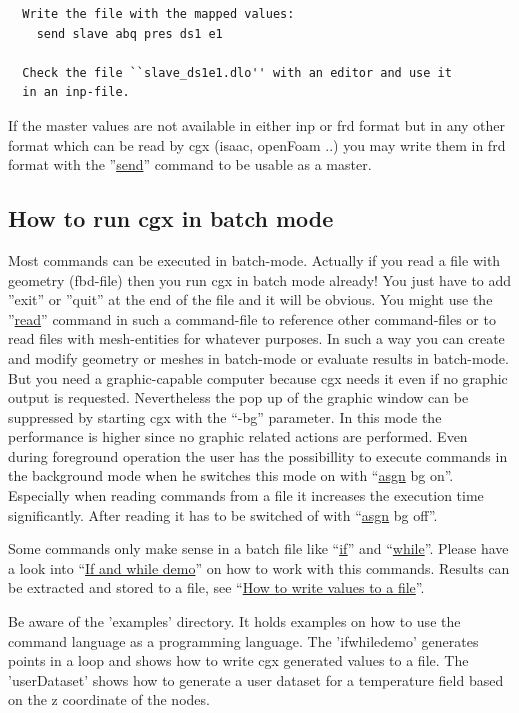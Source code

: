 \documentclass{article}
\providecommand{\htmlref}[2]{\hyperref[#2]{#1}}
\begin{document}
\begin{appendix}
\begin{verbatim}
  Write the file with the mapped values:
    send slave abq pres ds1 e1

  Check the file ``slave_ds1e1.dlo'' with an editor and use it
  in an inp-file.
\end{verbatim}
If the master values are not available in either inp or frd format but in any other format which can be read by cgx (isaac, openFoam ..) you may write them in frd format with the ''\htmlref{send}{send}'' command to be usable as a master.


\subsection{\label{How to run cgx in batch mode}How to run cgx in batch mode}
Most commands can be executed in batch-mode. Actually if you read a file with geometry (fbd-file) then you run cgx in batch mode already! You just have to add ''exit'' or ''quit'' at the end of the file and it will be obvious. You might use the ''\htmlref{read}{read}'' command in such a command-file to reference other command-files or to read files with mesh-entities for whatever purposes. In such a way you can create and modify geometry or meshes in batch-mode or evaluate results in batch-mode. But you need a graphic-capable computer because cgx needs it even if no graphic output is requested. Nevertheless the pop up of the graphic window can be suppressed by starting cgx with the ``-bg'' parameter. In this mode the performance is higher since no graphic related actions are performed. Even during foreground operation the user has the possibillity to execute commands in the background mode when he switches this mode on with ``\htmlref{asgn}{asgn} bg on''. Especially when reading commands from a file it increases the execution time significantly. After reading it has to be switched of with ``\htmlref{asgn}{asgn} bg off''.

Some commands only make sense in a batch file like ``\htmlref{if}{if}'' and ``\htmlref{while}{while}''. Please have a look into ``\htmlref{If and while demo}{If and while demo}'' on how to work with this commands. Results can be extracted and stored to a file, see ``\htmlref{How to write values to a file}{How to write values to a file}''.

Be aware of the 'examples' directory. It holds examples on how to use the command language as a programming language. The 'ifwhiledemo' generates points in a loop and shows how to write cgx generated values to a file. The 'userDataset' shows how to generate a user dataset for a temperature field based on the z coordinate of the nodes.


\end{appendix}
\end{document}
